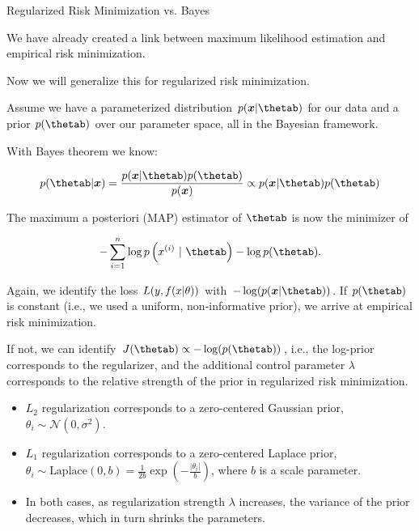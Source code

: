 \begin{vbframe} {Regularized Risk Minimization vs. Bayes}

We have already created a link between maximum likelihood estimation and empirical risk minimization.

\lz 

Now we will generalize this for regularized risk minimization.

\lz

Assume we have a parameterized distribution $p(\xv | \thetab)$ for our data and a prior $p(\thetab)$ over our
parameter space, all in the Bayesian framework.

\lz 

With Bayes theorem we know:

$$
p(\thetab | \xv) = \frac{p(\xv | \thetab) p(\thetab) }{p(\xv)} \propto p(\xv | \thetab) p(\thetab)
$$

\framebreak

The maximum a posteriori  (MAP) estimator of $\thetab$ is now the minimizer of

$$
- \sumin \log p\left(\xi ~|~ \thetab\right) - \log p(\thetab).
$$

Again, we identify the loss $L(y, f(x | \theta))$ with $-\log(p(\xv | \thetab))$. If $p(\thetab)$ is constant (i.e., we used a
  uniform, non-informative prior), we arrive at empirical risk minimization.

\lz 

If not, we can identify $J(\thetab) \propto -\log(p(\thetab))$, i.e., the log-prior corresponds to the regularizer, and the additional control parameter $\lambda$ corresponds to the relative strength of the prior in regularized risk minimization.

\framebreak

  \begin{figure}
    \centering
  \end{figure}
  
  \begin{itemize}
    \item $L_2$ regularization corresponds to a zero-centered Gaussian prior, $\theta_i \sim \mathcal{N}(0,\sigma^2)$.
    \item $L_1$ regularization corresponds to a zero-centered Laplace prior, $\theta_i \sim \text{Laplace}(0,b) = \frac{1}{2b}\exp(-\frac{|\theta_i|}{b})$, where $b$ is a scale parameter.
    \item In both cases, as regularization strength $\lambda$ increases, the variance of the prior decreases, which in turn shrinks the parameters.
  \end{itemize}
\end{vbframe}



